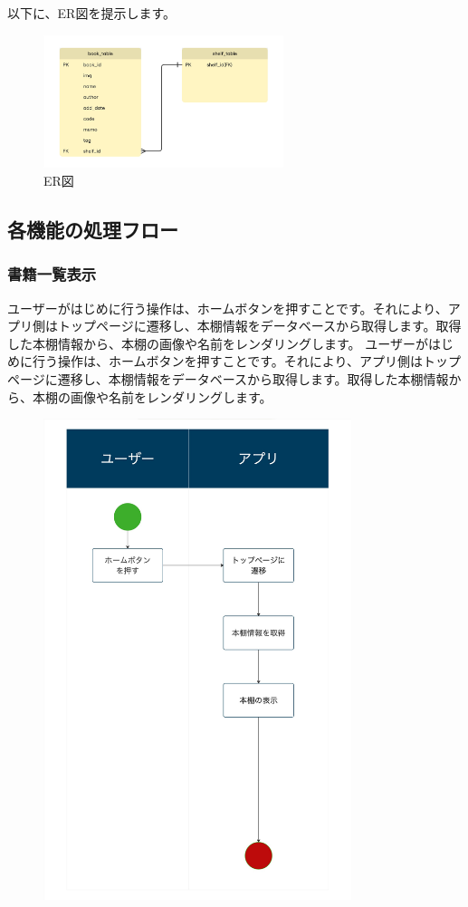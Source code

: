 \documentclass[a4paper, 11pt, titlepage]{jsarticle}
\begin{document}
以下に、ER図を提示します。
\begin{figure}[htbp]
\centering
\includegraphics[width=70mm]{ER_diagram.jpg}
\caption{ER図}
\label{fig:func}
\end{figure}


\clearpage
\subsection{各機能の処理フロー}
\subsubsection{書籍一覧表示}
ユーザーがはじめに行う操作は、ホームボタンを押すことです。それにより、アプリ側はトップページに遷移し、本棚情報をデータベースから取得します。取得した本棚情報から、本棚の画像や名前をレンダリングします。
ユーザーがはじめに行う操作は、ホームボタンを押すことです。それにより、アプリ側はトップページに遷移し、本棚情報をデータベースから取得します。取得した本棚情報から、本棚の画像や名前をレンダリングします。
\begin{figure}[htbp]
  \centering
  \includegraphics[width=90mm]{flow-ichiran.jpg}
  \label{fig:func}
\end{figure}
\end{document}
